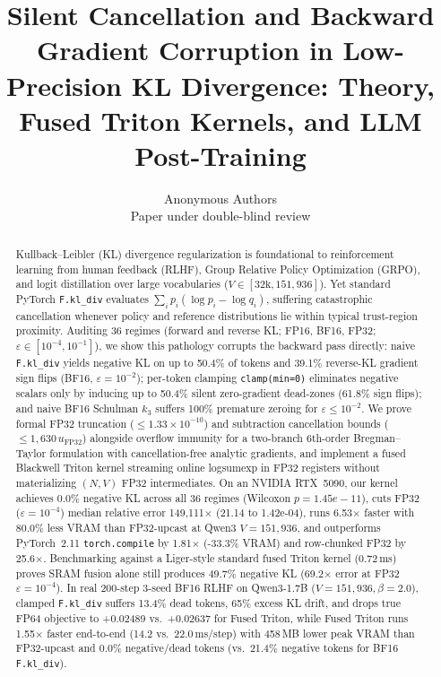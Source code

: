 \documentclass[10pt]{article}
\title{Silent Cancellation and Backward Gradient Corruption in Low-Precision KL Divergence: Theory, Fused Triton Kernels, and LLM Post-Training}
\author{\name Anonymous Authors \\
\addr Paper under double-blind review}
\begin{document}
\maketitle
\begin{abstract}
Kullback--Leibler (KL) divergence regularization is foundational to reinforcement learning from human feedback (RLHF), Group Relative Policy Optimization (GRPO), and logit distillation over large vocabularies ($V \in [32\text{k}, 151{,}936]$). Yet standard PyTorch \texttt{F.kl\_div} evaluates $\sum_i p_i (\log p_i - \log q_i)$, suffering catastrophic cancellation whenever policy and reference distributions lie within typical trust-region proximity. Auditing 36 regimes (forward and reverse KL; FP16, BF16, FP32; $\varepsilon \in [10^{-4}, 10^{-1}]$), we show this pathology corrupts the backward pass directly: naive \texttt{F.kl\_div} yields negative KL on up to 50.4\% of tokens and 39.1\% reverse-KL gradient sign flips (BF16, $\varepsilon=10^{-2}$); per-token clamping \texttt{clamp(min=0)} eliminates negative scalars only by inducing up to 50.4\% silent zero-gradient dead-zones (61.8\% sign flips); and naive BF16 Schulman $k_3$ suffers 100\% premature zeroing for $\varepsilon \le 10^{-2}$. We prove formal FP32 truncation ($\le 1.33\times 10^{-10}$) and subtraction cancellation bounds ($\le 1{,}630\,u_{\mathrm{FP32}}$) alongside overflow immunity for a two-branch 6th-order Bregman--Taylor formulation with cancellation-free analytic gradients, and implement a fused Blackwell Triton kernel streaming online logsumexp in FP32 registers without materializing $(N,V)$ FP32 intermediates. On an NVIDIA RTX~5090, our kernel achieves 0.0\% negative KL across all 36 regimes (Wilcoxon $p=1.45e-11$), cuts FP32 ($\varepsilon=10^{-4}$) median relative error 149,111$\times$ (21.14 to 1.42e-04), runs 6.53$\times$ faster with 80.0\% less VRAM than FP32-upcast at Qwen3 $V=151{,}936$, and outperforms PyTorch~2.11 \texttt{torch.compile} by 1.81$\times$ (-33.3\% VRAM) and row-chunked FP32 by 25.6$\times$. Benchmarking against a Liger-style standard fused Triton kernel (0.72\,ms) proves SRAM fusion alone still produces 49.7\% negative KL (69.2$\times$ error at FP32 $\varepsilon=10^{-4}$). In real 200-step 3-seed BF16 RLHF on Qwen3-1.7B ($V=151{,}936, \beta=2.0$), clamped \texttt{F.kl\_div} suffers 13.4\% dead tokens, 65\% excess KL drift, and drops true FP64 objective to +0.02489 vs.\ +0.02637 for Fused Triton, while Fused Triton runs 1.55$\times$ faster end-to-end (14.2 vs.\ 22.0\,ms/step) with 458\,MB lower peak VRAM than FP32-upcast and 0.0\% negative/dead tokens (vs.\ 21.4\% negative tokens for BF16 \texttt{F.kl\_div}).
\end{abstract}
\end{document}
